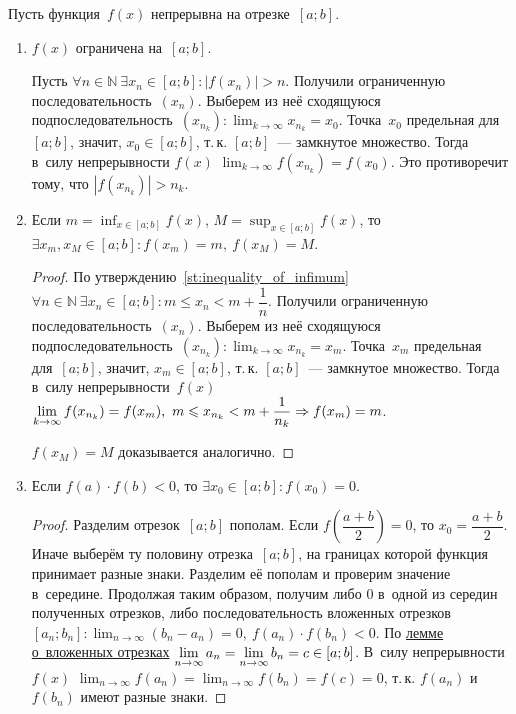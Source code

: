 Пусть функция~$f(x)$ непрерывна на отрезке~$[a; b]$.
\begin{enumerate}
	\item $f(x)$ ограничена на~$[a; b]$.
	\begin{proofcontra}
	Пусть $\forall n \in \mathbb N \ \exists x_n \in [a; b] \colon |f(x_n)| > n$.
	Получили ограниченную последовательность~$(x_n)$.
	Выберем из неё сходящуюся подпоследовательность~$\displaystyle (x_{n_k}) \colon \lim_{k \to \infty} x_{n_k} = x_0$.
	Точка~$x_0$ предельная для~$[a; b]$, значит, $x_0 \in [a; b]$, т.\,к. $[a; b]$~--- замкнутое множество.
	Тогда в~силу непрерывности $f(x)$ $\displaystyle \lim_{k \to \infty} f(x_{n_k}) = f(x_0)$.
	Это противоречит тому, что $|f(x_{n_k})| > n_k$.
	\end{proofcontra}
	
	\item\label{st:continuous_function_takes_inf_and_sup} Если $\displaystyle m = \inf_{x \in [a; b]} f(x)$, $\displaystyle M = \sup_{x \in [a; b]} f(x)$, то
	$\exists x_m, x_M \in [a; b] \colon f(x_m) = m, \ f(x_M) = M$.
	\begin{proof}
	По утверждению~\ref{st:inequality_of_infimum} $\forall n \in \mathbb N \ \exists x_n \in [a; b] \colon m \leqslant x_n < m + \dfrac1n$.
	Получили ограниченную последовательность~$(x_n)$.
	Выберем из неё сходящуюся подпоследовательность~$\displaystyle (x_{n_k}) \colon \lim_{k \to \infty} x_{n_k} = x_m$.
	Точка~$x_m$ предельная для~$[a; b]$, значит, $x_m \in [a; b]$, т.\,к. $[a; b]$~--- замкнутое множество.
	Тогда в~силу непрерывности~$f(x)$ $\displaystyle \lim_{k \to \infty} f(x_{n_k}) = f(x_m), \ m \leqslant x_{n_k} < m + \frac1{n_k} \opbr\Rightarrow f(x_m) = m$.
	
	$f(x_M) = M$ доказывается аналогично.
	\end{proof}
	
	\item \begin{theorem}
	\label{th:zero_of_continuous_function}
	Если $f(a) \cdot f(b) < 0$, то $\exists x_0 \in [a; b] \colon f(x_0) = 0$.
	\end{theorem}
	\begin{proof}
	Разделим отрезок~$[a; b]$ пополам.
	Если $f\left( \dfrac{a + b}2 \right) = 0$, то $x_0 = \dfrac{a + b}2$.
	Иначе выберём ту половину отрезка~$[a; b]$, на границах которой функция принимает разные знаки.
	Разделим её пополам и проверим значение в~середине.
	Продолжая таким образом, получим либо $0$ в~одной из середин полученных отрезков, либо последовательность вложенных отрезков~$\displaystyle [a_n; b_n] \colon \lim_{n \to \infty} (b_n - a_n) = 0, \ f(a_n) \cdot f(b_n) < 0$.
	По \hyperref[lemma:about_nested_intervals]{лемме о~вложенных отрезках} $\displaystyle \lim_{n \to \infty} a_n \opbr= \lim_{n \to \infty} b_n \opbr= c \in [a; b]$.
	В~силу непрерывности~$f(x)$ $\displaystyle \lim_{n \to \infty} f(a_n) = \lim_{n \to \infty} f(b_n) = f(c) = 0$, т.\,к. $f(a_n)$ и $f(b_n)$ имеют разные знаки.
	\end{proof}
	

\end{enumerate}
